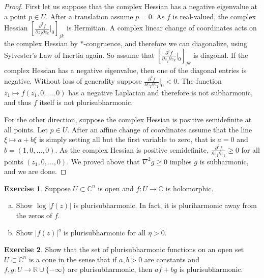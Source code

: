 \documentclass[12pt,openany]{book}
\newcommand{\sabs}[1]{\lvert {#1} \rvert}
\newcommand{\C}{{\mathbb{C}}}
\newcommand{\R}{{\mathbb{R}}}
\theoremstyle{plain}
\theoremstyle{remark}
\theoremstyle{definition}
\newenvironment{exbox}{%
    \def\FrameCommand{\vrule width 1pt \relax\hspace{10pt}}%
    \MakeFramed {\advance \hsize -\width \FrameRestore}%
}{%
    \endMakeFramed
}
\newenvironment{exparts}{%
    \leavevmode\begin{enumerate}[a),noitemsep,topsep=0pt,parsep=0pt,partopsep=0pt]
}{%
    \end{enumerate}
}
\theoremstyle{exercise}
\newtheorem{exercise}{Exercise}[section]
\theoremstyle{example}
\begin{document}
\begin{proof}
First let us suppose that the complex Hessian has a negative eigenvalue at
a point $p \in U$.
After a translation assume $p=0$.
As $f$ is real-valued, the complex Hessian
$\left[
\frac{\partial^2 f}{\partial \bar{z}_j \partial z_k}
\Big|_0
\right]_{jk}$ is Hermitian.  A complex linear change of coordinates
acts on the complex Hessian by $*$-congruence, and therefore we can
diagonalize,
using Sylvester's Law of Inertia again.
So assume that 
$\left[
\frac{\partial^2 f}{\partial \bar{z}_j \partial z_k}
\Big|_0
\right]_{jk}$ is diagonal.  If the complex Hessian has a negative eigenvalue, then
one of the diagonal entries is negative.
Without loss of generality suppose
$\frac{\partial^2 f}{\partial \bar{z}_1 \partial z_1}\Big|_0 < 0$.
The function $z_1 \mapsto f(z_1,0,\ldots,0)$ has
a negative Laplacian and therefore is not subharmonic, and thus $f$ itself
is not plurisubharmonic.

For the other direction, suppose the complex Hessian is positive
semidefinite at all points.
Let $p \in U$.  After an affine change of coordinates assume that the
line $\xi \mapsto a+b\xi$ is simply setting all but the first variable to
zero, that is $a=0$ and $b=(1,0,\ldots,0)$.
As the complex Hessian is positive semidefinite,
$\frac{\partial^2 f}{\partial \bar{z}_1 \partial z_1} \geq 0$ for all
points $(z_1,0,\ldots,0)$.  We proved above that $\nabla^2 g \geq 0$
implies $g$ is subharmonic, and we are done.
\end{proof}

\begin{exbox}
\begin{exercise} \label{exercise:modholplush}
Suppose $U \subset \C^n$ is open and $f \colon U \to \C$ is holomorphic.
\begin{exparts}
\item
Show $\log \sabs{f(z)}$ is plurisubharmonic.  In fact, it is pluriharmonic away from the zeros of $f$.
\item
Show $\sabs{f(z)}^{\eta}$ is plurisubharmonic for all $\eta > 0$.
\end{exparts}
\end{exercise}

\begin{exercise}
Show that the set of plurisubharmonic functions on an open set $U \subset \C^n$
is a cone in the sense that if $a,b > 0$ are constants and
$f, g \colon U \to \R \cup \{ -\infty \}$ are plurisubharmonic, then
$a f + b g$ is plurisubharmonic.
\end{exercise}
\end{exbox}
\end{document}
